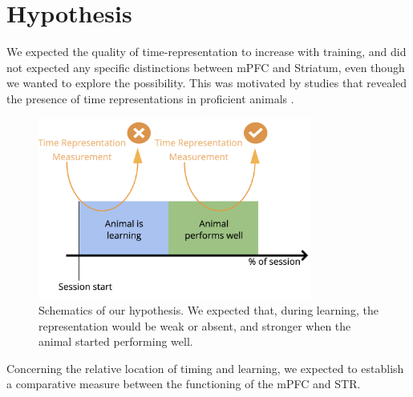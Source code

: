 \section{Hypothesis}
    We expected the quality of time-representation to increase with training, and did not expected any specific distinctions between mPFC and Striatum, even though we wanted to explore the possibility. This was motivated by studies that revealed the presence of time representations in proficient animals \cite{bakhurin2017differential,buhusi2018inactivation}.
    
    \begin{figure}
        \centering
        \includegraphics[width=0.8\textwidth]{figures/sketches/hypothesis.png}
        \caption[Visual sketch of our hypothesis.]{Schematics of our hypothesis. We expected that, during learning, the representation would be weak or absent, and stronger when the animal started performing well.}
        \label{fig:hip}
    \end{figure}
    
    
    Concerning the relative location of timing and learning, we expected to establish a comparative measure between the functioning of the mPFC and STR.
    
